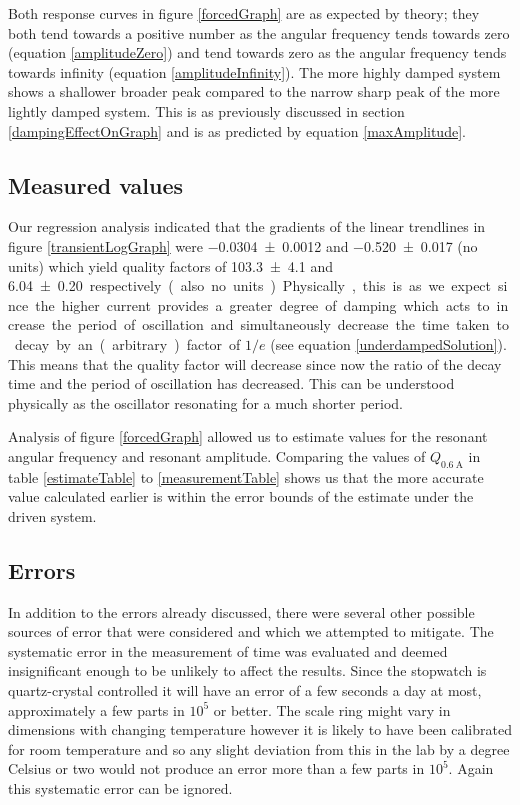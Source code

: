 \documentclass[12pt]{article}
\begin{document}
Both response curves in figure \ref{forcedGraph} are as expected by theory; they both tend towards a positive number as the angular frequency tends towards zero (equation \ref{amplitudeZero}) and tend towards zero as the angular frequency tends towards infinity (equation \ref{amplitudeInfinity}). The more highly damped system shows a shallower broader peak compared to the narrow sharp peak of the more lightly damped system. This is as previously discussed in section \ref{dampingEffectOnGraph} and is as predicted by equation \ref{maxAmplitude}.

\subsection{Measured values}
Our regression analysis indicated that the gradients of the linear trendlines in figure \ref{transientLogGraph} were \SI{-0.0304 \pm 0.0012}{} and \SI{-0.520 \pm 0.017}{} (no units) which yield quality factors of \SI{103.3 \pm 4.1}{} and \SI{6.04 \pm 0.20} respectively (also no units). Physically, this is as we expect since the higher current provides a greater degree of damping which acts to increase the period of oscillation and simultaneously decrease the time taken to decay by an (arbitrary) factor of $1/e$ (see equation \ref{underdampedSolution}). This means that the quality factor will decrease since now the ratio of the decay time and the period of oscillation has decreased. This can be understood physically as the oscillator resonating for a much shorter period.

Analysis of figure \ref{forcedGraph} allowed us to estimate values for the resonant angular frequency and resonant amplitude. Comparing the values of $Q_{\SI{0.6}{\ampere}}$ in table \ref{estimateTable} to \ref{measurementTable} shows us that the more accurate value calculated earlier is within the error bounds of the estimate under the driven system. 

\subsection{Errors}
In addition to the errors already discussed, there were several other possible sources of error that were considered and which we attempted to mitigate. The systematic error in the measurement of time was evaluated and deemed insignificant enough to be unlikely to affect the results. Since the stopwatch is quartz-crystal controlled it will have an error of a few seconds a day at most, approximately a few parts in $10^5$ or better. The scale ring might vary in dimensions with changing temperature however it is likely to have been calibrated for room temperature and so any slight deviation from this in the lab by a degree Celsius or two would not produce an error more than a few parts in $10^5$. Again this systematic error can be ignored.
\end{document}
